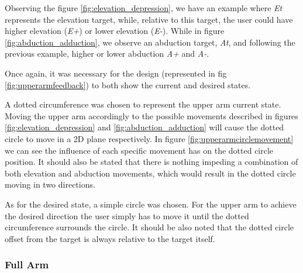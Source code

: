 Observing the figure \ref{fig:elevation_depression}, we have an example where \textit{Et} represents the elevation target, while, relative to this target, the user could have higher elevation (\textit{E+}) or lower elevation (\textit{E-}).
While in figure \ref{fig:abduction_adduction}, we observe an abduction target, \textit{At}, and following the previous example, higher or lower abduction \textit{A+} and \textit{A-}.

Once again, it was necessary for the design (represented in fig \ref{fig:upperarmfeedback}) to both show the current and desired states. 


A dotted circumference was chosen to represent the upper arm current state. Moving the upper arm accordingly to the possible movements described in figures \ref{fig:elevation_depression} and \ref{fig:abduction_adduction} will cause the dotted circle to move in a 2D plane respectively. 
In figure \ref{fig:upperarmcirclemovement} we can see the influence of each specific movement has on the dotted circle position. 
It should also be stated that there is nothing impeding a combination of both elevation and abduction movements, which would result in the dotted circle moving in two directions.

As for the desired state, a simple circle was chosen. 
For the upper arm to achieve the desired direction the user simply has to move it until the dotted circumference surrounds the circle.
It should be also noted that the dotted circle offset from the target is always relative to the target itself.


\subsubsection{Full Arm}

